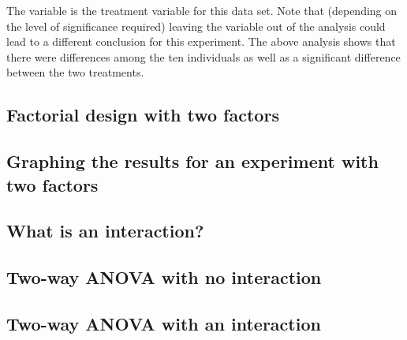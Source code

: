  
The  variable is the treatment variable for this data set. Note that (depending on the level of significance required) leaving the  variable out of the analysis could lead to a different conclusion for this experiment. The above analysis shows that there were differences among the ten individuals as well as a significant difference between the two treatments. 
 
 
\subsection{Factorial design with two factors} 
 
 
 
\subsection{Graphing the results for an experiment with two factors} 
 
\subsection{What is an interaction?} 
 
\subsection{Two-way ANOVA with no interaction} 
 
\subsection{Two-way ANOVA with an interaction} 
 



